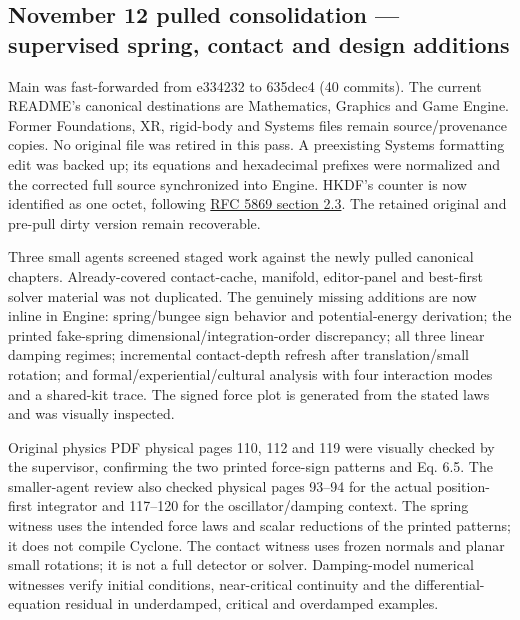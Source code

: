 \subsection{November 12 pulled consolidation --- supervised spring, contact and design additions}\label{appendix-a103e7846d21-november-12-pulled-consolidation-supervised-spring-contact-and-design-additions}

Main was fast-forwarded from e334232 to 635dec4 (40 commits). The current README's canonical destinations are Mathematics, Graphics and Game Engine. Former Foundations, XR, rigid-body and Systems files remain source/provenance copies. No original file was retired in this pass. A preexisting Systems formatting edit was backed up; its equations and hexadecimal prefixes were normalized and the corrected full source synchronized into Engine. HKDF's counter is now identified as one octet, following \href{https://www.rfc-editor.org/rfc/rfc5869.html\#section-2.3}{RFC 5869 section 2.3}. The retained original and pre-pull dirty version remain recoverable.

Three small agents screened staged work against the newly pulled canonical chapters. Already-covered contact-cache, manifold, editor-panel and best-first solver material was not duplicated. The genuinely missing additions are now inline in Engine: spring/bungee sign behavior and potential-energy derivation; the printed fake-spring dimensional/integration-order discrepancy; all three linear damping regimes; incremental contact-depth refresh after translation/small rotation; and formal/experiential/cultural analysis with four interaction modes and a shared-kit trace. The signed force plot is generated from the stated laws and was visually inspected.

Original physics PDF physical pages 110, 112 and 119 were visually checked by the supervisor, confirming the two printed force-sign patterns and Eq. 6.5. The smaller-agent review also checked physical pages 93--94 for the actual position-first integrator and 117--120 for the oscillator/damping context. The spring witness uses the intended force laws and scalar reductions of the printed patterns; it does not compile Cyclone. The contact witness uses frozen normals and planar small rotations; it is not a full detector or solver. Damping-model numerical witnesses verify initial conditions, near-critical continuity and the differential-equation residual in underdamped, critical and overdamped examples.

